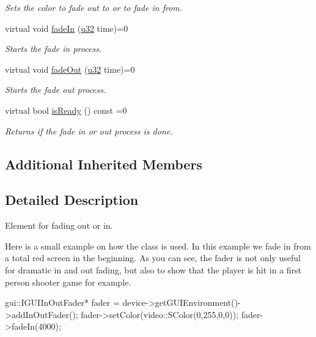 \begin{DoxyCompactItemize}
\begin{DoxyCompactList}\small\item\em Sets the color to fade out to or to fade in from. \end{DoxyCompactList}\item 
virtual void \hyperlink{classirr_1_1gui_1_1IGUIInOutFader_a407edab8f7e349612d62c39accc159e2}{fade\+In} (\hyperlink{namespaceirr_a0416a53257075833e7002efd0a18e804}{u32} time)=0
\begin{DoxyCompactList}\small\item\em Starts the fade in process. \end{DoxyCompactList}\item 
virtual void \hyperlink{classirr_1_1gui_1_1IGUIInOutFader_a5006c28699050d73be11b15ffc7ba993}{fade\+Out} (\hyperlink{namespaceirr_a0416a53257075833e7002efd0a18e804}{u32} time)=0
\begin{DoxyCompactList}\small\item\em Starts the fade out process. \end{DoxyCompactList}\item 
\mbox{\label{classirr_1_1gui_1_1IGUIInOutFader_a8a917f7c5c74ff0bdb2ba844f1953387}} 
virtual bool \hyperlink{classirr_1_1gui_1_1IGUIInOutFader_a8a917f7c5c74ff0bdb2ba844f1953387}{is\+Ready} () const =0
\begin{DoxyCompactList}\small\item\em Returns if the fade in or out process is done. \end{DoxyCompactList}\end{DoxyCompactItemize}
\subsection*{Additional Inherited Members}


\subsection{Detailed Description}
Element for fading out or in. 

Here is a small example on how the class is used. In this example we fade in from a total red screen in the beginning. As you can see, the fader is not only useful for dramatic in and out fading, but also to show that the player is hit in a first person shooter game for example. 
\begin{DoxyCode}
gui::IGUIInOutFader* fader = device->getGUIEnvironment()->addInOutFader();
fader->setColor(video::SColor(0,255,0,0));
fader->fadeIn(4000);
\end{DoxyCode}
 

